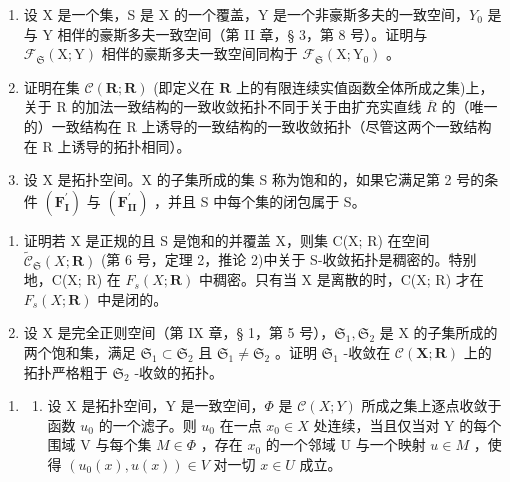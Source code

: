 \begin{enumerate}
\def\labelenumi{\arabic{enumi})}
\setcounter{enumi}{2}
\item
  设 X 是一个集，S 是 X 的一个覆盖，Y 是一个非豪斯多夫的一致空间，\(Y_{0}\) 是与 Y 相伴的豪斯多夫一致空间（第 II 章，§ 3，第 8 号）。证明与 \(\mathcal{F}_{\mathfrak{S}}(\mathrm{X};\mathrm{Y})\) 相伴的豪斯多夫一致空间同构于 \(\mathcal{F}_{\mathfrak{S}}(\mathrm{X};\mathrm{Y}_{0})\) 。
\item
  证明在集 \(\mathcal{C}(\mathbf{R};\mathbf{R})\) (即定义在 \(\mathbf{R}\) 上的有限连续实值函数全体所成之集)上，关于 R 的加法一致结构的一致收敛拓扑不同于关于由扩充实直线 \(\overline{R}\) 的（唯一的）一致结构在 R 上诱导的一致结构的一致收敛拓扑（尽管这两个一致结构在 R 上诱导的拓扑相同）。
\item
  设 X 是拓扑空间。X 的子集所成的集 S 称为饱和的，如果它满足第 2 号的条件 \((\mathbf{F}_{\mathbf{I}}^{\prime})\) 与 \((\mathbf{F}_{\mathbf{II}}^{\prime})\) ，并且 S 中每个集的闭包属于 S。
\end{enumerate}

\begin{enumerate}
\def\labelenumi{\alph{enumi})}
\item
  证明若 X 是正规的且 S 是饱和的并覆盖 X，则集 C(X; R) 在空间 \(\tilde{\mathcal{C}}_{\mathfrak{S}}(X; \mathbf{R})\) (第 6 号，定理 2，推论 2)中关于 S-收敛拓扑是稠密的。特别地，C(X; R) 在 \(F_{s}(X; \mathbf{R})\) 中稠密。只有当 X 是离散的时，C(X; R) 才在 \(F_{s}(X; \mathbf{R})\) 中是闭的。
\item
  设 X 是完全正则空间（第 IX 章，§ 1，第 5 号），\(\mathfrak{S}_1, \mathfrak{S}_2\) 是 X 的子集所成的两个饱和集，满足 \(\mathfrak{S}_1 \subset \mathfrak{S}_2\) 且 \(\mathfrak{S}_1 \neq \mathfrak{S}_2\) 。证明 \(\mathfrak{S}_1\) -收敛在 \(\mathcal{C}(\mathbf{X}; \mathbf{R})\) 上的拓扑严格粗于 \(\mathfrak{S}_2\) -收敛的拓扑。
\end{enumerate}

\begin{enumerate}
\def\labelenumi{\arabic{enumi})}
\setcounter{enumi}{5}
\tightlist
\item
  \begin{enumerate}
  \def\labelenumii{\alph{enumii})}
  \tightlist
  \item
    设 X 是拓扑空间，Y 是一致空间，\(\Phi\) 是 \(\mathcal{C}(X;Y)\) 所成之集上逐点收敛于函数 \(u_{0}\) 的一个滤子。则 \(u_{0}\) 在一点 \(x_{0}\in X\) 处连续，当且仅当对 Y 的每个围域 V 与每个集 \(M\in\Phi\) ，存在 \(x_{0}\) 的一个邻域 U 与一个映射 \(u\in M\) ，使得 \((u_{0}(x),u(x))\in V\) 对一切 \(x\in U\) 成立。
  \end{enumerate}
\end{enumerate}

